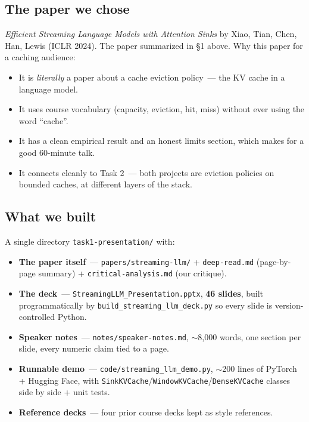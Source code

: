 \documentclass[11pt,a4paper]{article}
\begin{document}
\subsection{The paper we chose}
\emph{Efficient Streaming Language Models with Attention Sinks} by Xiao,
Tian, Chen, Han, Lewis (ICLR 2024). The paper summarized in \S1 above.
Why this paper for a caching audience:
\begin{itemize}[leftmargin=1.5em,itemsep=0.1em]
  \item It is \emph{literally} a paper about a cache eviction policy~---
        the KV cache in a language model.
  \item It uses course vocabulary (capacity, eviction, hit, miss) without
        ever using the word ``cache''.
  \item It has a clean empirical result and an honest limits section,
        which makes for a good 60-minute talk.
  \item It connects cleanly to Task 2~--- both projects are eviction
        policies on bounded caches, at different layers of the stack.
\end{itemize}

\subsection{What we built}
A single directory \texttt{task1-presentation/} with:
\begin{itemize}[leftmargin=1.5em,itemsep=0.1em]
  \item \textbf{The paper itself}~--- \texttt{papers/streaming-llm/} +
        \texttt{deep-read.md} (page-by-page summary) +
        \texttt{critical-analysis.md} (our critique).
  \item \textbf{The deck}~--- \texttt{StreamingLLM\_Presentation.pptx},
        \textbf{46 slides}, built programmatically by
        \texttt{build\_streaming\_llm\_deck.py} so every slide is
        version-controlled Python.
  \item \textbf{Speaker notes}~--- \texttt{notes/speaker-notes.md},
        $\sim$8{,}000 words, one section per slide, every numeric claim
        tied to a page.
  \item \textbf{Runnable demo}~--- \texttt{code/streaming\_llm\_demo.py},
        $\sim$200 lines of PyTorch + Hugging Face, with
        \texttt{SinkKVCache}/\texttt{WindowKVCache}/\texttt{DenseKVCache}
        classes side by side + unit tests.
  \item \textbf{Reference decks}~--- four prior course decks kept as
        style references.
\end{itemize}
\end{document}
